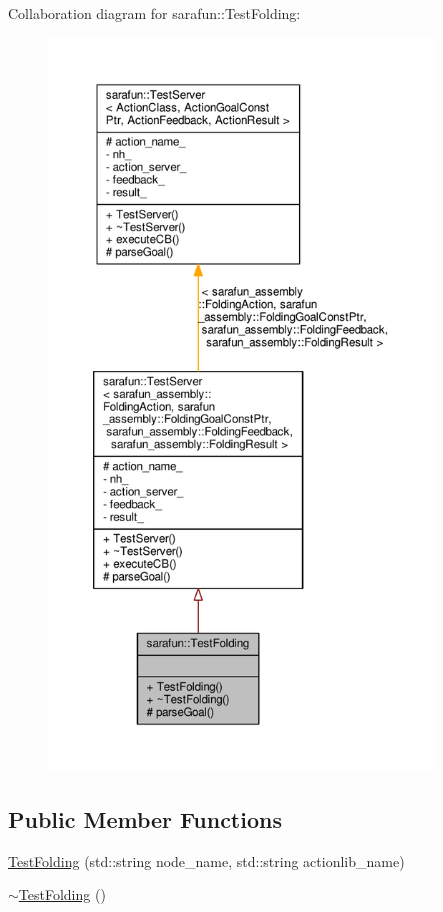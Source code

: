 Collaboration diagram for sarafun\-:\-:Test\-Folding\-:\nopagebreak
\begin{figure}[H]
\begin{center}
\leavevmode
\includegraphics[height=550pt]{d4/da4/classsarafun_1_1TestFolding__coll__graph}
\end{center}
\end{figure}
\subsection*{Public Member Functions}
\begin{DoxyCompactItemize}
\item 
\hyperlink{classsarafun_1_1TestFolding_a8e2588633f0ed83b89bc36cd68e537d8_a8e2588633f0ed83b89bc36cd68e537d8}{Test\-Folding} (std\-::string node\-\_\-name, std\-::string actionlib\-\_\-name)
\item 
\hyperlink{classsarafun_1_1TestFolding_ae84f7398db7911dc72a929e9b4d71726_ae84f7398db7911dc72a929e9b4d71726}{$\sim$\-Test\-Folding} ()
\end{DoxyCompactItemize}
